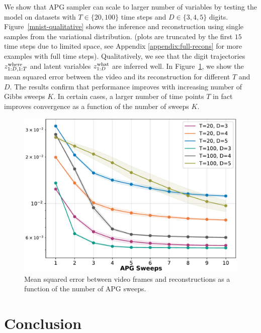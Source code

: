 \documentclass[anonymous=false, %
               format=acmsmall, %
               review=true, %
               screen=true, %
               nonacm=true]{acmart}
\theoremstyle{definition}
\begin{document}
We show that APG sampler can scale to larger number of variables by testing the model on datasets with $T\in \{20, 100\}$ time steps  and $D \in \{3, 4, 5\}$ digits. Figure~\ref{mnist-qualitative} shows the inference and reconstruction using single samples from the variational distribution. (plots are truncated by the first $15$ time steps due to limited space, see Appendix \ref{appendix:full-recons} for more examples with full time steps). 
Qualitatively, we see that the digit trajectories $z_{1:D, 1:T}^{\mathrm{where}}$ and latent variables $z_{1:D}^{\mathrm{what}}$ are inferred well.
In Figure~\ref{plot-mse-bmnist}, we show the mean squared error between the video and its reconstruction for different $T$ and $D$.
The results confirm that performance improves with increasing number of Gibbs sweeps $K$.
In certain cases, a larger number of time points $T$ in fact improves convergence as a function of the number of sweeps $K$.

\begin{figure}[!t]
    \centering
    \includegraphics[width=0.5\columnwidth]{figures/bmnist-mse.pdf}
    \caption{Mean squared error between video frames and reconstructions as a function of the number of APG sweeps. }
    \label{plot-mse-bmnist}
\end{figure}

\section{Conclusion}

\end{document}
